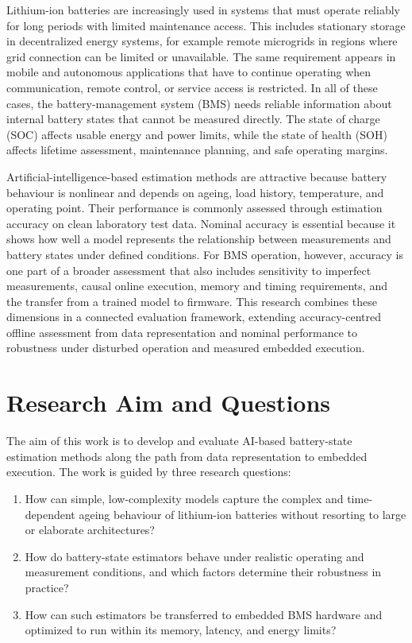 \documentclass[
    a4paper,
    12pt,
    titlepage,
    bibliography=totoc,
    twoside=on,
    parskip=false,
    numbers=noenddot,
    cleardoublepage=empty,
    DIV=12,
    BCOR=12.0mm,
    headheight=36pt,
    headings=openright
]{scrreprt}
\begin{document}
Lithium-ion batteries are increasingly used in systems that must operate reliably for long periods with limited maintenance access. This includes stationary storage in decentralized energy systems, for example remote microgrids in regions where grid connection can be limited or unavailable. The same requirement appears in mobile and autonomous applications that have to continue operating when communication, remote control, or service access is restricted. In all of these cases, the battery-management system (BMS) needs reliable information about internal battery states that cannot be measured directly. The state of charge (SOC) affects usable energy and power limits, while the state of health (SOH) affects lifetime assessment, maintenance planning, and safe operating margins.

Artificial-intelligence-based estimation methods are attractive because battery behaviour is nonlinear and depends on ageing, load history, temperature, and operating point. Their performance is commonly assessed through estimation accuracy on clean laboratory test data. Nominal accuracy is essential because it shows how well a model represents the relationship between measurements and battery states under defined conditions. For BMS operation, however, accuracy is one part of a broader assessment that also includes sensitivity to imperfect measurements, causal online execution, memory and timing requirements, and the transfer from a trained model to firmware. This research combines these dimensions in a connected evaluation framework, extending accuracy-centred offline assessment from data representation and nominal performance to robustness under disturbed operation and measured embedded execution.

\section{Research Aim and Questions}
The aim of this work is to develop and evaluate AI-based battery-state estimation methods along the path from data representation to embedded execution. The work is guided by three research questions:

\begin{enumerate}[leftmargin=*]
\item How can simple, low-complexity models capture the complex and time-dependent ageing behaviour of lithium-ion batteries without resorting to large or elaborate architectures?
\item How do battery-state estimators behave under realistic operating and measurement conditions, and which factors determine their robustness in practice?
\item How can such estimators be transferred to embedded BMS hardware and optimized to run within its memory, latency, and energy limits?
\end{enumerate}
\end{document}
